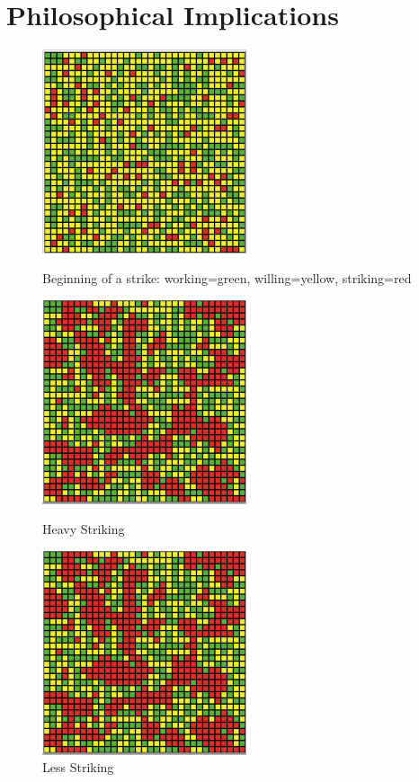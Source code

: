 \documentclass[11pt]{article}
\begin{document}
\section{Philosophical Implications} \hrulefill
\begin{figure}[htbp]
	\centering
	\includegraphics[width=6cm, height=6cm]{verystart}
	\caption{Beginning of a strike: working=green, willing=yellow, striking=red}
	\centering
	\includegraphics[width=6cm, height=6cm]{heavystriking}
	\caption{Heavy Striking}
	\centering
	\includegraphics[width=6cm, height=6cm]{heavystriking}
	\caption{Less Striking}
	
\end{figure}
\end{document}

